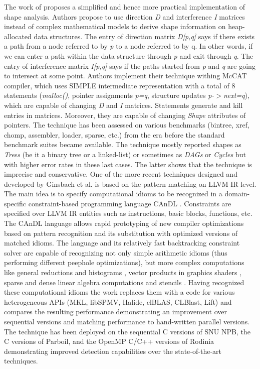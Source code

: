 \quad The work of \cite{Ghiya:1996:TDC:237721.237724} proposes a simplified and hence more practical implementation of shape analysis. Authors propose to use direction \textit{D} and interference \textit{I} matrices instead of complex mathematical models to derive shape information on heap-allocated data structures. The entry of direction matrix \textit{D[p,q]} says if there exists a path from a node referred to by \textit{p} to a node referred to by q. In other words, if we can enter a path within the data structure through \textit{p} and exit through \textit{q}. The entry of interference matrix \textit{I[p,q]} says if the paths started from \textit{p} and \textit{q} are going to intersect at some point. Authors implement their technique withing McCAT compiler, which uses SIMPLE intermediate representation with a total of 8 statements (\textit{malloc()}, pointer assignments \textit{p=q}, structure updates \textit{p-$>$next=q}), which are capable of changing \textit{D} and \textit{I} matrices. Statements generate and kill entries in matrices. Moreover, they are capable of changing \textit{Shape} attributes of pointers. The technique has been assessed on various benchmarks (bintree, xref, chomp, assembler, loader, sparse, etc.) from the era before the standard benchmark suites became available. The technique mostly reported shapes as \textit{Trees} (be it a binary tree or a linked-list) or sometimes as \textit{DAGs} or \textit{Cycles} but with higher error rates in these last cases. The latter shows that the technique is imprecise and conservative.\newline\null
\quad One of the more recent techniques designed and developed by Ginsbach et al. is based on the pattern matching on LLVM IR level. The main idea is to specify computational idioms to be recognized in a domain-specific constraint-based programming language CAnDL \cite{Ginsbach:2018:CDS:3178372.3179515}. Constraints are specified over LLVM IR entities such as instructions, basic blocks, functions, etc. The CAnDL language allows rapid prototyping of new compiler optimizations based on pattern recognition and its substitution with optimized versions of matched idioms. The language and its relatively fast backtracking constraint solver are capable of recognizing not only simple arithmetic idioms (thus performing different peephole optimizations), but more complex computations like general reductions and histograms \cite{Ginsbach:2017:DEG:3049832.3049862}, vector products in graphics shaders \cite{Ginsbach:2018:AML:3296957.3173182}, sparse and dense linear algebra computations and stencils \cite{Ginsbach:2018:AML:3296957.3173182}. Having recognized these computational idioms the work \cite{Ginsbach:2018:AML:3296957.3173182} replaces them with a code for various heterogeneous APIs (MKL, libSPMV, Halide, clBLAS, CLBlast, Lift) and compares the resulting performance demonstrating an improvement over sequential versions and matching performance to hand-written parallel versions. The technique has been deployed on the sequential C versions of SNU NPB, the C versions of Parboil, and the OpenMP C/C++ versions of Rodinia demonstrating improved detection capabilities over the state-of-the-art techniques.\newline\null
